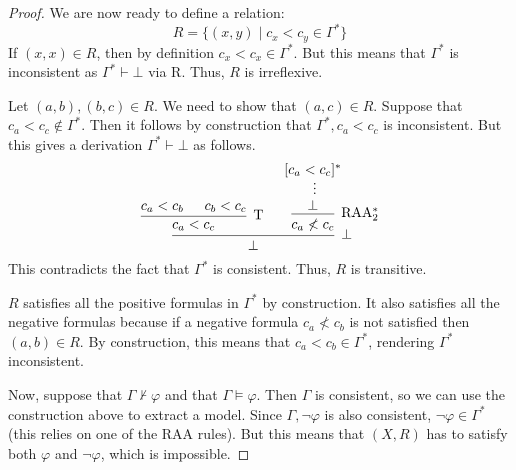 \documentclass[a4paper]{article}
\begin{document}
\begin{enumerate}
\begin{proof}
    We are now ready to define a relation:
    \[
      R = \{(x,y) \mid c_{x} < c_{y} \in \Gamma^{*}\}
    \]
    If $(x,x) \in R$, then by definition $c_{x} < c_{x} \in \Gamma^{*}$.
    But this means that $\Gamma^{*}$ is inconsistent as $\Gamma^* \vdash \bot$ via R.
    Thus, $R$ is irreflexive.

    Let $(a,b),(b,c) \in R$.
    We need to show that $(a,c) \in R$.
    Suppose that $c_{a} < c_{c} \notin \Gamma^*$.
    Then it follows by construction that $\Gamma^*,c_{a} < c_{c}$ is inconsistent.
    But this gives a derivation $\Gamma^* \vdash \bot$ as follows.
    \[\begin{prooftree}
        \hypo{c_{a} < c_{b}}
        \hypo{c_{b} < c_{c}}
        \infer2[T]{c_{a} < c_{c}}
        \hypo{[c_{a} < c_{c}]^*}
        \ellipsis{}{\bot}
        \infer1[RAA$_2^*$]{c_{a} \nless c_{c}}
        \infer2[$\bot$]{\bot}
      \end{prooftree}\]
    This contradicts the fact that $\Gamma^*$ is consistent.
    Thus, $R$ is transitive.

    $R$ satisfies all the positive formulas in $\Gamma^*$ by construction.
    It also satisfies all the negative formulas because if a negative formula $c_a \nless c_b$ is not satisfied then $(a,b) \in R$.
    By construction, this means that $c_a < c_b \in \Gamma^*$, rendering $\Gamma^*$ inconsistent.

    Now, suppose that $\Gamma \nvdash \varphi$ and that $\Gamma \vDash \varphi$.
    Then $\Gamma$ is consistent, so we can use the construction above to extract a model.
    Since $\Gamma,\lnot\varphi$ is also consistent, $\lnot\varphi \in \Gamma^*$ (this relies on one of the RAA rules).
    But this means that $(X,R)$ has to satisfy both $\varphi$ and $\lnot\varphi$, which is impossible.
  \end{proof}
\end{enumerate}

\end{document}

